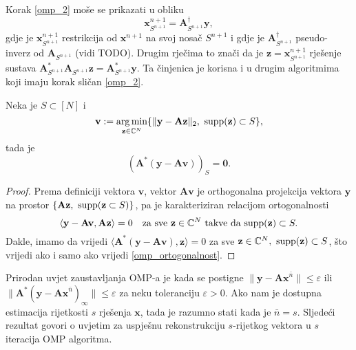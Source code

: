 \documentclass[a4paper,twoside,12pt]{memoir} %
\newcommand{\vect}[1]{\mathbf{#1}}
\renewcommand{\vec}{\vect}
\newcommand{\supp}{\text{\normalfont{supp}}}
\newcommand{\norm}[1]{\|{#1}\|}
\DeclareMathOperator*{\argmin}{arg\,min}
\begin{document}
Korak \eqref{omp_2} mo\v{s}e se prikazati u obliku
\begin{equation*}
    \vec{x}_{S^{n+1}}^{n+1} = \vec{A}_{S^{n+1}}^{\dagger}\vec y,
\end{equation*}
gdje je $\vec{x}_{S^{n+1}}^{n+1}$ restrikcija od $\vec x^{n+1}$ na svoj nosa\v{c} $S^{n+1}$ i gdje je $\vec A^{\dagger}_{S^{n+1}}$ pseudo-inverz od $\vec{A}_{S^{n+1}}$ (vidi TODO). Drugim rje\v{c}ima to zna\v{c}i da je $\vec z = \vec x ^{n+1}_{S^{n+1}}$ rje\v{s}enje sustava $\vec A^*_{S^{n+1}} \vec A_{S^{n+1}} \vec z = \vec A^*_{S^{n+1}} \vec y$. Ta \v{c}injenica je korisna i u drugim algoritmima koji imaju korak sli\v{c}an \eqref{omp_2}.
\begin{lem}\label{omp_lema_1}
    Neka je $S \subset [N]$ i
    \begin{equation*}
        \vec v := \argmin_{\vec z \in \C^N} \{\norm{\vec y - \vec{Az}}_2,\ \supp(\vec z) \subset S\},
    \end{equation*}
    tada je
    \begin{equation}\label{omp_ortogonalnost}
        (\vec A^*(\vec y - \vec{Av}))_S = \vec 0.
    \end{equation}
\end{lem}
\begin{proof}
    Prema definiciji vektora $\vec v$, vektor $\vec{Av}$ je orthogonalna projekcija vektora $\vec y$ na prostor $\{\vec{Az},\ \supp(\vec{z} \subset S)\}$, pa je karakteriziran relacijom ortogonalnosti
    \begin{equation*}
        \langle \vec y - \vec{Av}, \vec{Az} \rangle = 0 \quad \text{za sve }\vec z \in \C^N \ \text{takve da } \supp(\vec z) \subset S.
    \end{equation*}
    Dakle, imamo da vrijedi $\langle \vec A^*( \vec y - \vec{Av}), \vec{z} \rangle = 0$ za sve $\vec z \in \C^N,\ \supp(\vec z) \subset S$, \v{s}to vrijedi ako i samo ako vrijedi \eqref{omp_ortogonalnost}.
\end{proof}

Prirodan uvjet zaustavljanja OMP-a je kada se postigne $\norm{\vec{y} - \vec{Ax}^{\bar{n}}} \leq \varepsilon$ ili $\norm{\vec A^*(\vec y - \vec{Ax}^{\bar{n}})_{\infty}} \leq \varepsilon$ za neku toleranciju $\varepsilon > 0$. Ako nam je dostupna estimacija rijetkosti $s$ rje\v{s}enja $\vec x$, tada je razumno stati kada je $\bar{n} = s$. Sljede\'ci rezultat govori o uvjetim za uspje\v{s}nu rekonstrukciju $s$-rijetkog vektora u $s$ iteracija OMP algoritma.
\end{document}
